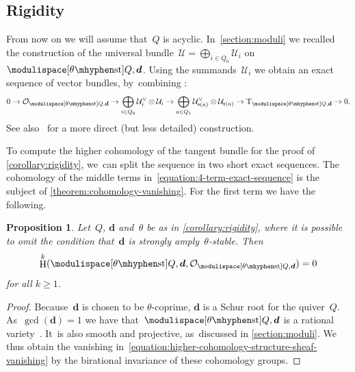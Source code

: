 \documentclass[JEP,XML,SOM,Unicode,NoEqCountersInSection,published]{cedram}
\let\ra\rightarrow
\theoremstyle{plain}
\newtheorem{proposition}[theorem]{Proposition}
\theoremstyle{definition}
\DeclareMathOperator\HH{H}
\DeclareMathOperator\source{s}
\DeclareMathOperator\target{t}
\newcommand\stable{\ensuremath{\mhyphen\mathrm{st}}}
\newcommand\tangent{\ensuremath{\mathrm{T}}}
\newcommand\tuple[1]{\ensuremath{{\boldsymbol{#1}}}}
\begin{document}
\subsection{Rigidity}
\label{subsection:rigidity}
From now on we will assume that~$Q$ is acyclic. In~\cref{section:moduli} we recalled the construction of the universal bundle~$\mathcal{U}=\bigoplus_{i\in Q_0}\mathcal{U}_i$
on~$\modulispace[\theta\stable]{Q,\tuple{d}}$.
\hbox{Using} the summands~$\mathcal{U}_i$ we obtain an exact sequence of vector bundles, by~combining \hbox{\cite[Prop.\,3.3 \& Prop.\,3.7]{MR4770368}}:
\begin{equation}
\label{equation:4-term-exact-sequence}
0
\ra\mathcal{O}_{\modulispace[\theta\stable]{Q,\tuple{d}}}
\to\bigoplus_{i \in Q_0} \mathcal{U}^\vee_i \otimes \mathcal{U}_i
\to\bigoplus_{a \in Q_1} \mathcal{U}^\vee_{\source(a)} \otimes \mathcal{U}_{\target(a)}
\to\tangent_{\modulispace[\theta\stable]{Q,\tuple{d}}}
\ra0.
\end{equation}
See also~\cite[\S 4.1]{MR4352662} for a more direct (but less detailed) construction.

To compute the higher cohomology of the tangent bundle for the proof of \cref{corollary:rigidity}, we~can split the sequence in two short exact sequences.
The cohomology of the middle terms in~\eqref{equation:4-term-exact-sequence}
is the subject of \cref{theorem:cohomology-vanishing}.
For the first term we have the following.

\begin{proposition}
Let~$Q$, $\tuple{d}$ and~$\theta$ be as in \cref{corollary:rigidity},
where it is possible to omit the condition that~$\tuple{d}$ is strongly amply~$\theta$-stable.
Then
\begin{equation}
\label{equation:higher-cohomology-structure-sheaf-vanishing}
\HH^k(\modulispace[\theta\stable]{Q,\tuple{d}},\mathcal{O}_{\modulispace[\theta\stable]{Q,\tuple{d}}}) = 0
\end{equation}
for all $k \geq 1$.
\end{proposition}

\begin{proof}
Because~$\tuple{d}$ is chosen to be $\theta$-coprime,
$\tuple{d}$ is a Schur root for the quiver~$Q$.
As~$\gcd(\tuple{d}) = 1$
we have that~$\modulispace[\theta\stable]{Q,\tuple{d}}$ is a rational variety~\cite[Th.\,6.4]{MR1914089}. It~is also smooth and projective, as~discussed in \cref{section:moduli}.
We thus obtain the vanishing in~\eqref{equation:higher-cohomology-structure-sheaf-vanishing}
by the birational invariance of these cohomology groups.
\end{proof}
\end{document}
